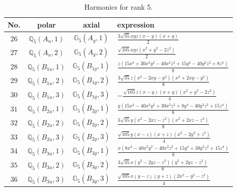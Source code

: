 \documentclass[fleqn,8pt,landscape]{jsarticle}
\begin{document}
\begin{table}[ht!]
\begin{center}
\caption{Harmonics for rank 5.}
\renewcommand{\arraystretch}{1.3}
\begin{tabular}{cccl} \hline \hline
No. & polar & axial & expression \\ \hline
$ 26 $ & $ \mathbb{Q}_{5}(A_{u},1) $ & $ \mathbb{G}_{5}(A_{g},1) $ & $ \frac{3 \sqrt{35} x y z \left(x - y\right) \left(x + y\right)}{2} $ \\
$ 27 $ & $ \mathbb{Q}_{5}(A_{u},2) $ & $ \mathbb{G}_{5}(A_{g},2) $ & $ \frac{\sqrt{105} x y z \left(x^{2} + y^{2} - 2 z^{2}\right)}{2} $ \\
$ 28 $ & $ \mathbb{Q}_{5}(B_{1u},1) $ & $ \mathbb{G}_{5}(B_{1g},1) $ & $ \frac{z \left(15 x^{4} + 30 x^{2} y^{2} - 40 x^{2} z^{2} + 15 y^{4} - 40 y^{2} z^{2} + 8 z^{4}\right)}{8} $ \\
$ 29 $ & $ \mathbb{Q}_{5}(B_{1u},2) $ & $ \mathbb{G}_{5}(B_{1g},2) $ & $ \frac{3 \sqrt{35} z \left(x^{2} - 2 x y - y^{2}\right) \left(x^{2} + 2 x y - y^{2}\right)}{8} $ \\
$ 30 $ & $ \mathbb{Q}_{5}(B_{1u},3) $ & $ \mathbb{G}_{5}(B_{1g},3) $ & $ - \frac{\sqrt{105} z \left(x - y\right) \left(x + y\right) \left(x^{2} + y^{2} - 2 z^{2}\right)}{4} $ \\
$ 31 $ & $ \mathbb{Q}_{5}(B_{2u},1) $ & $ \mathbb{G}_{5}(B_{2g},1) $ & $ \frac{y \left(15 x^{4} - 40 x^{2} y^{2} + 30 x^{2} z^{2} + 8 y^{4} - 40 y^{2} z^{2} + 15 z^{4}\right)}{8} $ \\
$ 32 $ & $ \mathbb{Q}_{5}(B_{2u},2) $ & $ \mathbb{G}_{5}(B_{2g},2) $ & $ \frac{3 \sqrt{35} y \left(x^{2} - 2 x z - z^{2}\right) \left(x^{2} + 2 x z - z^{2}\right)}{8} $ \\
$ 33 $ & $ \mathbb{Q}_{5}(B_{2u},3) $ & $ \mathbb{G}_{5}(B_{2g},3) $ & $ \frac{\sqrt{105} y \left(x - z\right) \left(x + z\right) \left(x^{2} - 2 y^{2} + z^{2}\right)}{4} $ \\
$ 34 $ & $ \mathbb{Q}_{5}(B_{3u},1) $ & $ \mathbb{G}_{5}(B_{3g},1) $ & $ \frac{x \left(8 x^{4} - 40 x^{2} y^{2} - 40 x^{2} z^{2} + 15 y^{4} + 30 y^{2} z^{2} + 15 z^{4}\right)}{8} $ \\
$ 35 $ & $ \mathbb{Q}_{5}(B_{3u},2) $ & $ \mathbb{G}_{5}(B_{3g},2) $ & $ \frac{3 \sqrt{35} x \left(y^{2} - 2 y z - z^{2}\right) \left(y^{2} + 2 y z - z^{2}\right)}{8} $ \\
$ 36 $ & $ \mathbb{Q}_{5}(B_{3u},3) $ & $ \mathbb{G}_{5}(B_{3g},3) $ & $ \frac{\sqrt{105} x \left(y - z\right) \left(y + z\right) \left(2 x^{2} - y^{2} - z^{2}\right)}{4} $ \\
 \hline \hline
\end{tabular}
\end{center}
\end{table}
\end{document}
